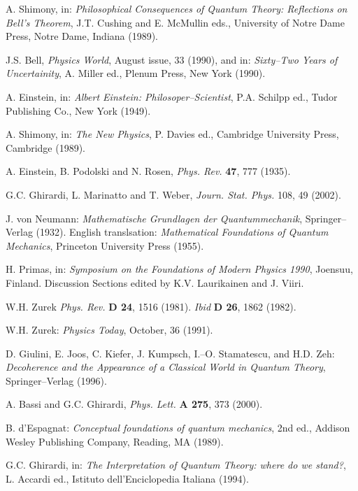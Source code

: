 \documentclass[12pt]{article}
\begin{document}
\begin{thebibliography}{999}

 A. Shimony, in: {\it Philosophical Consequences
of Quantum Theory: Reflections on Bell's Theorem}, J.T. Cushing
and E. McMullin eds., University of Notre Dame Press, Notre Dame,
Indiana (1989).

 J.S. Bell, {\it Physics World}, August issue, 33
(1990), and in: {\it Sixty--Two Years of Uncertainity}, A. Miller
ed., Plenum Press, New York (1990).

 A. Einstein, in: {\it Albert Einstein:
Philosoper--Scientist}, P.A. Schilpp ed., Tudor Publishing Co.,
New York (1949).

 A. Shimony, in: {\it The New Physics}, P. Davies
ed., Cambridge University Press, Cambridge (1989).

 A. Einstein, B. Podolski and N. Rosen, {\it Phys.
Rev.} {\bf 47}, 777 (1935).

 G.C. Ghirardi, L. Marinatto and T. Weber, {\it
Journ. Stat. Phys.} 108, 49 (2002).

 J. von Neumann: {\it Mathematische Grundlagen der
Quantummechanik}, Springer--Verlag (1932). English translsation:
{\it Mathematical Foundations of Quantum Mechanics}, Princeton
University Press (1955).

 H. Primas, in: {\it Symposium on the Foundations of
Modern Physics 1990}, Joensuu, Finland. Discussion Sections edited
by K.V. Laurikainen and J. Viiri.

 W.H. Zurek {\it Phys. Rev.} {\bf D 24}, 1516
(1981). {\it Ibid} {\bf D 26}, 1862 (1982).

 W.H. Zurek: {\it Physics Today}, October, 36 (1991).

 D. Giulini, E. Joos, C. Kiefer, J. Kumpsch, I.--O.
Stamatescu, and H.D. Zeh: {\it Decoherence and the Appearance of a
Classical World in Quantum Theory}, Springer--Verlag (1996).

 A. Bassi and G.C. Ghirardi, {\it Phys. Lett.} {\bf A
275}, 373 (2000).

 B. d'Espagnat: {\it Conceptual foundations of quantum
mechanics}, 2nd ed., Addison Wesley Publishing Company, Reading,
MA (1989).

 G.C. Ghirardi, in: {\it The Interpretation of
Quantum Theory: where do we stand?}, L. Accardi ed., Istituto
dell'Enciclopedia Italiana (1994).


\end{thebibliography}
\end{document}
